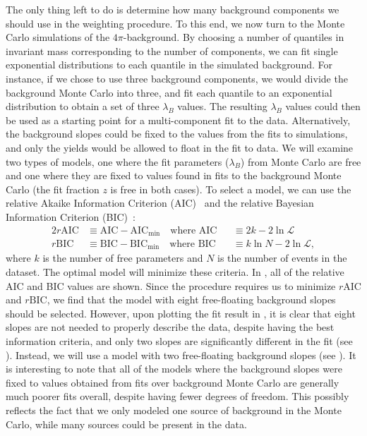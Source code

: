 The only thing left to do is determine how many background components we should use in the weighting procedure. To this end, we now turn to the Monte Carlo simulations of the $4\pi$-background. By choosing a number of quantiles in invariant mass corresponding to the number of components, we can fit single exponential distributions to each quantile in the simulated background. For instance, if we chose to use three background components, we would divide the background Monte Carlo into three, and fit each quantile to an exponential distribution to obtain a set of three $\lambda_B$ values. The resulting  $\lambda_B$ values could then be used as a starting point for a multi-component fit to the data. Alternatively, the background slopes could be fixed to the values from the fits to simulations, and only the yields would be allowed to float in the fit to data. We will examine two types of models, one where the fit parameters ($\lambda_B$) from Monte Carlo are free and one where they are fixed to values found in fits to the background Monte Carlo (the fit fraction $z$ is free in both cases). To select a model, we can use the relative Akaike Information Criterion (AIC)~\cite{Akaike1998} and the relative Bayesian Information Criterion (BIC)~\cite{Schwarz1978}:
\begin{alignat}{2}
  r\text{AIC} &\equiv \text{AIC} - \text{AIC}_\text{min} \quad\text{where } \text{AIC} &&\equiv 2k - 2\ln\mathcal{L} \\
  r\text{BIC} &\equiv \text{BIC} - \text{BIC}_\text{min} \quad\text{where } \text{BIC} &&\equiv k\ln{N} - 2\ln\mathcal{L},
  \label{eq:information-criteria}
\end{alignat}
where $k$ is the number of free parameters and $N$ is the number of events in the dataset. The optimal model will minimize these criteria. In , all of the relative AIC and BIC values are shown. Since the procedure requires us to minimize $r\text{AIC}$ and $r\text{BIC}$, we find that the model with eight free-floating background slopes should be selected. However, upon plotting the fit result in , it is clear that eight slopes are not needed to properly describe the data, despite having the best information criteria, and only two slopes are significantly different in the fit (see ). Instead, we will use a model with two free-floating background slopes (see ). It is interesting to note that all of the models where the background slopes were fixed to values obtained from fits over background Monte Carlo are generally much poorer fits overall, despite having fewer degrees of freedom. This possibly reflects the fact that we only modeled one source of background in the Monte Carlo, while many sources could be present in the data.

